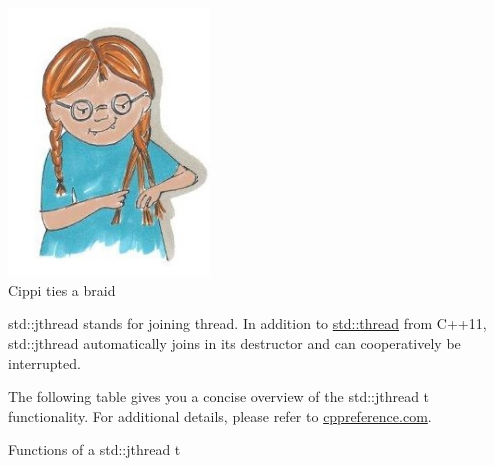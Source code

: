 \begin{center}
\includegraphics[width=0.4\textwidth]{content/3/chapter6/images/24.png}\\
Cippi ties a braid
\end{center}

std::jthread stands for joining thread. In addition to \href{https://en.cppreference.com/w/cpp/thread/thread}{std::thread} from C++11, std::jthread automatically joins in its destructor and can cooperatively be interrupted.

The following table gives you a concise overview of the std::jthread t functionality. For additional details, please refer to \href{https://en.cppreference.com/w/cpp/thread/jthread}{cppreference.com}.

\begin{center}
Functions of a std::jthread t
\end{center}

